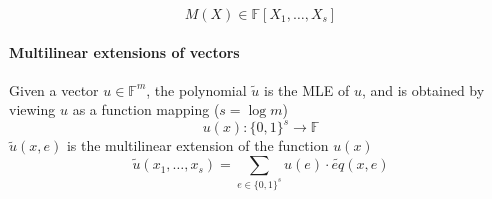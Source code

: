 \documentclass{article}
\theoremstyle{definition}
\begin{document}
$$M(X) \in \mathbb{F}[X_1, \ldots, X_s]$$

\paragraph{Multilinear extensions of vectors}
Given a vector $u \in \mathbb{F}^m$, the polynomial $\widetilde{u}$ is the MLE of $u$, and is obtained by viewing $u$ as a function mapping ($s=\log m$)
$$u(x): \{0,1\}^s \rightarrow \mathbb{F}$$
$\widetilde{u}(x, e)$ is the multilinear extension of the function $u(x)$
$$\widetilde{u}(x_1, \ldots, x_s) = \sum_{e \in \{0,1\}^s} u(e) \cdot \widetilde{eq}(x, e)$$



\end{document}
